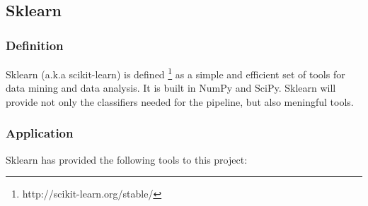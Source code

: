 \subsection{Sklearn}
\subsubsection{Definition}
Sklearn (a.k.a scikit-learn) is defined \footnote{http://scikit-learn.org/stable/} as a simple and efficient set of tools for data mining and data analysis. It is built in NumPy and SciPy. Sklearn will provide not only the classifiers needed for the pipeline, but also meningful tools.
\subsubsection{Application}
Sklearn has provided the following tools to this project:
